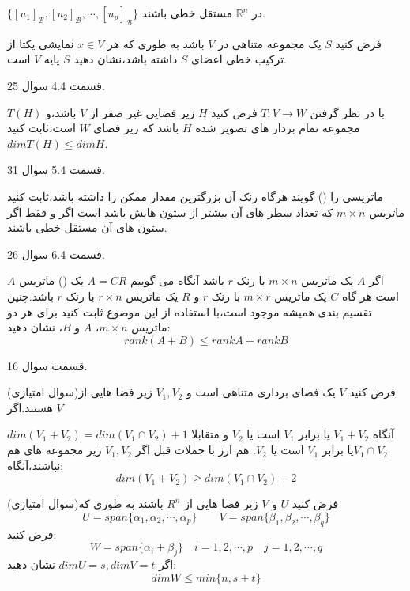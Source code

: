 \documentclass{article}
\begin{document}
$\{[u_1]_\mathcal{B},[u_2]_\mathcal{B},\cdots,[u_p]_\mathcal{B}\}$
در 
$\mathbb{R}^n$
مستقل خطی باشند.


 فرض کنید 
$S$
یک مجموعه متناهی در 
$V$
باشد به طوری که هر 
$x\in V$
نمایشی یکتا از ترکیب خطی اعضای 
$S$
داشته باشد،نشان دهید 
$S$
پایه 
$V$
است.
\begin{حل}
	قسمت 4.4 سوال 25.
	\end{حل}
با در نظر گرفتن 
$T:V\longrightarrow W$
فرض کنید 
$H$
زیر فضایی غیر صفر از 
$V$
باشد،و 
$T(H)$
مجموعه تمام بردار های تصویر شده 
$H$
باشد که زیر فضای 
$W$
است،ثابت کنید
$dim T(H)\leq dim H$.

\begin{حل}
	قسمت 5.4 سوال 31.
\end{حل}

ماتریسی را 
()
گویند هرگاه رنک آن بزرگترین مقدار ممکن را داشته باشد،ثابت کنید ماتریس 
$m\times n$
که تعداد سطر های آن بیشتر از ستون هایش باشد 
است اگر و فقط اگر ستون های آن مستقل خطی باشند. 
\begin{حل}
	قسمت 6.4 سوال 26.
\end{حل}
اگر 
$A$
یک ماتریس 
$m\times n$
با رنک 
$r$
باشد آنگاه می گوییم 
$A=CR$
 یک 
()
ماتریس 
$A$
است هر گاه
$C$
یک ماتریس 
$m\times r$
با رنک
$r$
و 
$R$
یک ماتریس 
$r\times n$
با رنک 
$r$
باشد.چنین تقسیم بندی همیشه موجود است،با استفاده از این موضوع ثابت کنید برای هر دو ماتریس 
$m\times n$،
$A$
و
$B$،
نشان دهید:
$$rank(A+B)\leq rank A+rank B$$
\begin{حل}
	قسمت 
	سوال 16.
\end{حل}

(سوال امتیازی)فرض کنید
$V$
 یک فضای برداری متناهی است و 
$V_1,V_2$
زیر فضا هایی از 
$V$
هستند.اگر 


$dim(V_1+V_2)=dim(V_1\cap V_2)+1$
آنگاه 
$V_1+V_2$
یا برابر 
$V_1$
است یا 
$V_2$
و متقابلا 
$V_1\cap V_2 $یا برابر 
$V_1$
است یا 
$V_2$.
هم ارز با جملات قبل اگر 
$V_1,V_2$
زیر مجموعه های هم نباشند،آنگاه:
$$dim(V_1+V_2)\geq dim(V_1\cap V_2)+2$$

(سوال امتیازی)فرض کنید 
$U$
و
$V$
زیر فضا هایی از 
$R^n$
باشند به طوری که 
$$U=span\{\alpha_1,\alpha_2,\cdots,\alpha_p\}\qquad V=span\{\beta_1,\beta_2,\cdots,\beta_q\}$$
فرض کنید:
$$W=span\{\alpha_i+\beta_j\}\quad i=1,2,\cdots,p \quad j=1,2,\cdots,q$$
اگر 
$dimU=s, dim V=t$
نشان دهید:
$$dimW\leq min\{n,s+t\}$$
\end{document}
